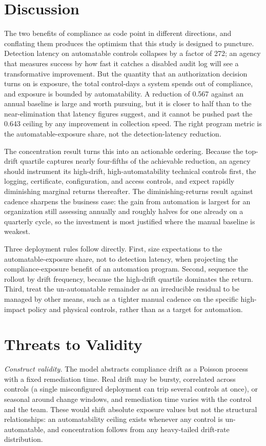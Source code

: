 \documentclass[journal]{IEEEtran}
\begin{document}
\section{Discussion}
The two benefits of compliance as code point in different directions, and conflating them produces
the optimism that this study is designed to puncture. Detection latency on automatable controls
collapses by a factor of 272; an agency that measures success by how fast it catches a disabled
audit log will see a transformative improvement. But the quantity that an authorization decision
turns on is exposure, the total control-days a system spends out of compliance, and exposure is
bounded by automatability. A reduction of 0.567 against an annual baseline is large and worth
pursuing, but it is closer to half than to the near-elimination that latency figures suggest, and
it cannot be pushed past the 0.643 ceiling by any improvement in collection speed. The right
program metric is the automatable-exposure share, not the detection-latency reduction.

The concentration result turns this into an actionable ordering. Because the top-drift quartile
captures nearly four-fifths of the achievable reduction, an agency should instrument its
high-drift, high-automatability technical controls first, the logging, certificate, configuration,
and access controls, and expect rapidly diminishing marginal returns thereafter. The diminishing-returns
result against cadence sharpens the business case: the gain from automation is largest for an
organization still assessing annually and roughly halves for one already on a quarterly cycle, so
the investment is most justified where the manual baseline is weakest.

Three deployment rules follow directly. First, size expectations to the automatable-exposure share,
not to detection latency, when projecting the compliance-exposure benefit of an
automation program. Second, sequence the rollout by drift frequency, because the high-drift
quartile dominates the return. Third, treat the un-automatable remainder as an irreducible
residual to be managed by other means, such as a tighter manual cadence on the specific
high-impact policy and physical controls, rather than as a target for automation.

\section{Threats to Validity}
\emph{Construct validity.} The model abstracts compliance drift as a Poisson process with a fixed
remediation time. Real drift may be bursty, correlated across controls (a single misconfigured
deployment can trip several controls at once), or seasonal around change windows, and remediation
time varies with the control and the team. These would shift absolute exposure values but not the
structural relationships: an automatability ceiling exists whenever any control is un-automatable,
and concentration follows from any heavy-tailed drift-rate distribution.
\end{document}
